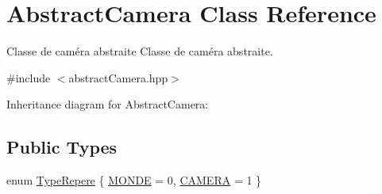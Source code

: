 \hypertarget{class_abstract_camera}{}\section{Abstract\+Camera Class Reference}
\label{class_abstract_camera}


Classe de caméra abstraite Classe de caméra abstraite.  




{\ttfamily \#include $<$abstract\+Camera.\+hpp$>$}



Inheritance diagram for Abstract\+Camera\+:
\subsection*{Public Types}
\begin{DoxyCompactItemize}
\item 
enum \hyperlink{class_abstract_camera_a4d3cc29d2eb150eada1bb387648eae98}{Type\+Repere} \{ \hyperlink{class_abstract_camera_a4d3cc29d2eb150eada1bb387648eae98a4136744a39efe4b86f6743eecc488eb8}{M\+O\+N\+DE} = 0, 
\hyperlink{class_abstract_camera_a4d3cc29d2eb150eada1bb387648eae98a7fc33f57f9cabf6771b5fdfa9c64494c}{C\+A\+M\+E\+RA} = 1
 \}
\end{DoxyCompactItemize}
